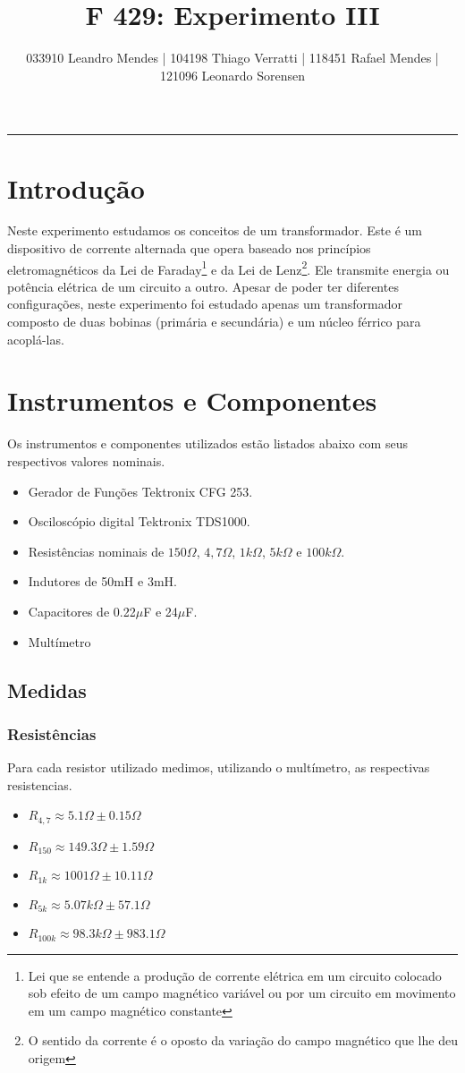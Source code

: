 \documentclass[12pt,letterpaper]{article}
\title{F 429: Experimento III}
\author{033910 Leandro Mendes | 104198 Thiago Verratti | 118451 Rafael Mendes | 121096 Leonardo Sorensen}
\makeatletter
\def\thickhrulefill{\leavevmode \leaders \hrule height 1pt\hfill \kern \z@}
\renewcommand{\maketitle}{
	\begingroup
		\parindent \z@
		\begin{center}
			{\normalsize \@author\par}%
			\thickhrulefill\par
			{\small\raggedleft \@date\par}%
			{\Large\raggedright \@title\par}%
		\end{center}%
	\endgroup
}
\makeatother
\begin{document}
\maketitle
\tableofcontents
\listoffigures
\listoftables
\newpage
\section{Introdução}
Neste experimento estudamos os conceitos de um transformador. Este é um dispositivo de corrente alternada que opera baseado nos princípios eletromagnéticos da Lei de Faraday\footnote{Lei que se entende a produção de corrente elétrica em um circuito colocado sob efeito de um campo magnético variável ou por um circuito em movimento em um campo magnético constante} e da Lei de Lenz\footnote{O sentido da corrente é o oposto da variação do campo magnético que lhe deu origem}. Ele transmite energia ou potência elétrica de um circuito a outro. Apesar de poder ter diferentes configurações, neste experimento foi estudado apenas um transformador composto de duas bobinas (primária e secundária) e um núcleo férrico para acoplá-las.
\section{Instrumentos e Componentes}
Os instrumentos e componentes utilizados estão listados abaixo com seus respectivos valores nominais.
\begin{itemize}
\item{Gerador de Funções Tektronix CFG 253.} 
\item{Osciloscópio digital Tektronix TDS1000.}
\item{Resistências nominais de $150\Omega$, $4,7\Omega$, $1k\Omega$, $5k\Omega$ e $100k\Omega$.}
\item{Indutores de 50mH e 3mH.}
\item{Capacitores de 0.22$\mu$F e 24$\mu$F.}
\item{Multímetro}
\end{itemize}
\subsection{Medidas}
\subsubsection{Resistências} \label{itm:mres} Para cada resistor utilizado medimos, utilizando o multímetro, as respectivas resistencias.
\begin{itemize}
\item{$R_{4,7} \approx 5.1\Omega \pm 0.15\Omega$}
\item{$R_{150} \approx 149.3\Omega \pm 1.59\Omega$}
\item{$R_{1k} \approx 1001\Omega \pm 10.11\Omega$}
\item{$R_{5k} \approx 5.07k\Omega \pm 57.1\Omega$}
\item{$R_{100k} \approx 98.3k\Omega \pm 983.1\Omega$}
\end{itemize}
\end{document}
